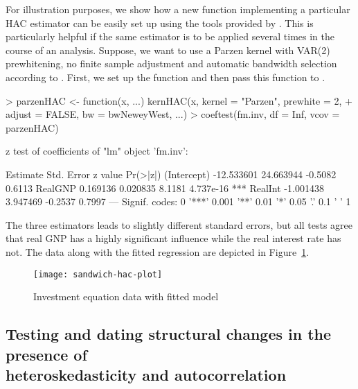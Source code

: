 \documentclass{Z}
\begin{document}
For illustration purposes, we show how a new function implementing a particular
HAC estimator can be easily set up using the tools provided by .
This is particularly helpful if the same estimator is to be applied several times
in the course of an analysis. Suppose, we want to use a Parzen kernel with VAR(2)
prewhitening, no finite sample adjustment and automatic bandwidth selection
according to \cite{hac:Newey+West:1994}. First, we set
up the function  and then pass this function to . 
\begin{Schunk}
\begin{Sinput}
> parzenHAC <- function(x, ...) kernHAC(x, kernel = "Parzen", prewhite = 2, 
+     adjust = FALSE, bw = bwNeweyWest, ...)
> coeftest(fm.inv, df = Inf, vcov = parzenHAC)
\end{Sinput}
\begin{Soutput}
z test of coefficients of "lm" object 'fm.inv':

              Estimate Std. Error z value  Pr(>|z|)    
(Intercept) -12.533601  24.663944 -0.5082    0.6113    
RealGNP       0.169136   0.020835  8.1181 4.737e-16 ***
RealInt      -1.001438   3.947469 -0.2537    0.7997    
---
Signif. codes:  0 '***' 0.001 '**' 0.01 '*' 0.05 '.' 0.1 ' ' 1 
\end{Soutput}
\end{Schunk}
The three estimators leads to slightly different standard errors, but all
tests agree that real GNP has a highly significant influence while
the real interest rate has not. The data along with the fitted regression
are depicted in Figure~\ref{fig:hac}.

\begin{figure}[tbh]
\begin{center}
\texttt{[image: sandwich-hac-plot]}
\caption{\label{fig:hac} Investment equation data with fitted model}
\end{center}
\end{figure}

\subsection[Testing and dating structural changes in the presence of heteroskedasticity and autocorrelation]{Testing and dating structural changes in the presence of\\ heteroskedasticity and autocorrelation}
\end{document}
